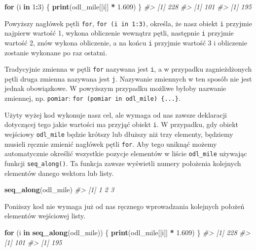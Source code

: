 \documentclass[paper=6in:9in,pagesize=pdftex,headinclude=on,footinclude=on,10pt]{scrbook}
\newenvironment{Shaded}{\begin{snugshade}}{\end{snugshade}}
\newcommand{\CommentTok}[1]{\textcolor[rgb]{0.56,0.35,0.01}{\textit{#1}}}
\newcommand{\ControlFlowTok}[1]{\textcolor[rgb]{0.13,0.29,0.53}{\textbf{#1}}}
\newcommand{\DecValTok}[1]{\textcolor[rgb]{0.00,0.00,0.81}{#1}}
\newcommand{\FloatTok}[1]{\textcolor[rgb]{0.00,0.00,0.81}{#1}}
\newcommand{\KeywordTok}[1]{\textcolor[rgb]{0.13,0.29,0.53}{\textbf{#1}}}
\newcommand{\NormalTok}[1]{#1}
\newcommand{\OperatorTok}[1]{\textcolor[rgb]{0.81,0.36,0.00}{\textbf{#1}}}
\newcommand{\StringTok}[1]{\textcolor[rgb]{0.31,0.60,0.02}{#1}}
\let\BeginKnitrBlock\begin \let\EndKnitrBlock\end
\begin{document}
\begin{Shaded}
\begin{Highlighting}[]
\ControlFlowTok{for}\NormalTok{ (i }\ControlFlowTok{in} \DecValTok{1}\OperatorTok{:}\DecValTok{3}\NormalTok{) \{}
  \KeywordTok{print}\NormalTok{(odl_mile[[i]] }\OperatorTok{*}\StringTok{ }\FloatTok{1.609}\NormalTok{)}
\NormalTok{\}}
\CommentTok{#> [1] 228}
\CommentTok{#> [1] 101}
\CommentTok{#> [1] 195}
\end{Highlighting}
\end{Shaded}

Powyższy nagłówek pętli \texttt{for}, \texttt{for\ (i\ in\ 1:3)}, określa, że nasz obiekt \texttt{i} przyjmie najpierw wartość 1, wykona obliczenie wewnątrz pętli, następnie \texttt{i} przyjmie wartość 2, znów wykona obliczenie, a na końcu \texttt{i} przyjmie wartość 3 i obliczenie zostanie wykonane po raz ostatni.

\BeginKnitrBlock{rmdinfo}
Tradycyjnie zmienna w pętli \texttt{for} nazywana jest \texttt{i}, a w przypadku zagnieżdżonych pętli druga zmienna nazywana jest \texttt{j}.
Nazywanie zmiennych w ten sposób nie jest jednak obowiązkowe.
W powyższym przypadku możliwe byłoby nazwanie zmiennej, np. \texttt{pomiar}: \texttt{for\ (pomiar\ in\ odl\_mile)\ \{...\}}.
\EndKnitrBlock{rmdinfo}

Użyty wyżej kod wykonuje nasz cel, ale wymaga od nas zawsze deklaracji dotyczącej tego jakie wartości ma przyjąć obiekt \texttt{i}.
W przypadku, gdy obiekt wejściowy \texttt{odl\_mile} będzie krótszy lub dłuższy niż trzy elementy, będziemy musieli ręcznie zmienić nagłówek pętli \texttt{for}.
Aby tego uniknąć możemy automatycznie określić wszystkie pozycje elementów w liście \texttt{odl\_mile} używając funkcji \texttt{seq\_along()}.
Ta funkcja zawsze wyświetli numery położenia kolejnych elementów danego wektora lub listy.

\begin{Shaded}
\begin{Highlighting}[]
\KeywordTok{seq_along}\NormalTok{(odl_mile)}
\CommentTok{#> [1] 1 2 3}
\end{Highlighting}
\end{Shaded}

Poniższy kod nie wymaga już od nas ręcznego wprowadzania kolejnych położeń elementów wejściowej listy.

\begin{Shaded}
\begin{Highlighting}[]
\ControlFlowTok{for}\NormalTok{ (i }\ControlFlowTok{in} \KeywordTok{seq_along}\NormalTok{(odl_mile)) \{}
  \KeywordTok{print}\NormalTok{(odl_mile[[i]] }\OperatorTok{*}\StringTok{ }\FloatTok{1.609}\NormalTok{)}
\NormalTok{\}}
\CommentTok{#> [1] 228}
\CommentTok{#> [1] 101}
\CommentTok{#> [1] 195}
\end{Highlighting}
\end{Shaded}
\end{document}

